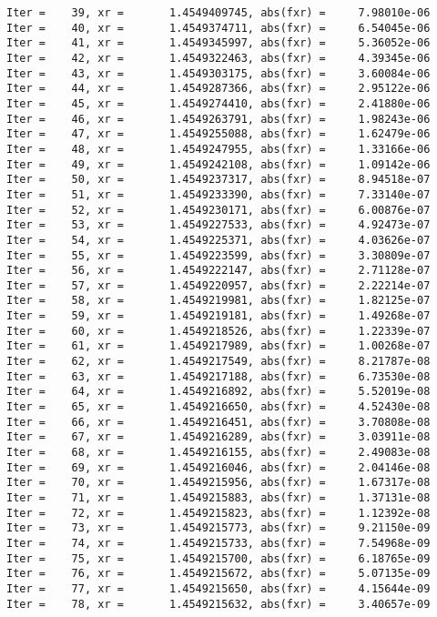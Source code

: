 \documentclass[11pt]{article}
\begin{document}
\begin{Verbatim}[commandchars=\\\{\}]
Iter =    39, xr =       1.4549409745, abs(fxr) =     7.98010e-06
Iter =    40, xr =       1.4549374711, abs(fxr) =     6.54045e-06
Iter =    41, xr =       1.4549345997, abs(fxr) =     5.36052e-06
Iter =    42, xr =       1.4549322463, abs(fxr) =     4.39345e-06
Iter =    43, xr =       1.4549303175, abs(fxr) =     3.60084e-06
Iter =    44, xr =       1.4549287366, abs(fxr) =     2.95122e-06
Iter =    45, xr =       1.4549274410, abs(fxr) =     2.41880e-06
Iter =    46, xr =       1.4549263791, abs(fxr) =     1.98243e-06
Iter =    47, xr =       1.4549255088, abs(fxr) =     1.62479e-06
Iter =    48, xr =       1.4549247955, abs(fxr) =     1.33166e-06
Iter =    49, xr =       1.4549242108, abs(fxr) =     1.09142e-06
Iter =    50, xr =       1.4549237317, abs(fxr) =     8.94518e-07
Iter =    51, xr =       1.4549233390, abs(fxr) =     7.33140e-07
Iter =    52, xr =       1.4549230171, abs(fxr) =     6.00876e-07
Iter =    53, xr =       1.4549227533, abs(fxr) =     4.92473e-07
Iter =    54, xr =       1.4549225371, abs(fxr) =     4.03626e-07
Iter =    55, xr =       1.4549223599, abs(fxr) =     3.30809e-07
Iter =    56, xr =       1.4549222147, abs(fxr) =     2.71128e-07
Iter =    57, xr =       1.4549220957, abs(fxr) =     2.22214e-07
Iter =    58, xr =       1.4549219981, abs(fxr) =     1.82125e-07
Iter =    59, xr =       1.4549219181, abs(fxr) =     1.49268e-07
Iter =    60, xr =       1.4549218526, abs(fxr) =     1.22339e-07
Iter =    61, xr =       1.4549217989, abs(fxr) =     1.00268e-07
Iter =    62, xr =       1.4549217549, abs(fxr) =     8.21787e-08
Iter =    63, xr =       1.4549217188, abs(fxr) =     6.73530e-08
Iter =    64, xr =       1.4549216892, abs(fxr) =     5.52019e-08
Iter =    65, xr =       1.4549216650, abs(fxr) =     4.52430e-08
Iter =    66, xr =       1.4549216451, abs(fxr) =     3.70808e-08
Iter =    67, xr =       1.4549216289, abs(fxr) =     3.03911e-08
Iter =    68, xr =       1.4549216155, abs(fxr) =     2.49083e-08
Iter =    69, xr =       1.4549216046, abs(fxr) =     2.04146e-08
Iter =    70, xr =       1.4549215956, abs(fxr) =     1.67317e-08
Iter =    71, xr =       1.4549215883, abs(fxr) =     1.37131e-08
Iter =    72, xr =       1.4549215823, abs(fxr) =     1.12392e-08
Iter =    73, xr =       1.4549215773, abs(fxr) =     9.21150e-09
Iter =    74, xr =       1.4549215733, abs(fxr) =     7.54968e-09
Iter =    75, xr =       1.4549215700, abs(fxr) =     6.18765e-09
Iter =    76, xr =       1.4549215672, abs(fxr) =     5.07135e-09
Iter =    77, xr =       1.4549215650, abs(fxr) =     4.15644e-09
Iter =    78, xr =       1.4549215632, abs(fxr) =     3.40657e-09

\end{Verbatim}
\end{document}
